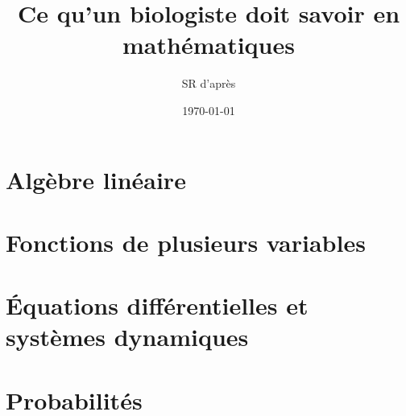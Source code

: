 \documentclass[french, 12pt]{report}
\title{\Huge{Ce qu'un biologiste doit savoir en mathématiques}}
\author{SR d'après \cite{Lam20}}
\date{\today}
\begin{document}

\maketitle
\dominitoc
\tableofcontents


\chapter{Algèbre linéaire}
\minitoc
\newpage  
\newpage 
\newpage 
\newpage 

\chapter{Fonctions de plusieurs variables}
\minitoc
\newpage 
\newpage 
\newpage 

\chapter{\'Equations différentielles et systèmes dynamiques}
\minitoc
\newpage 
\newpage 
\newpage 
\newpage 

\chapter{Probabilités}
\minitoc
\newpage 
\newpage 
\newpage 



\end{document}
